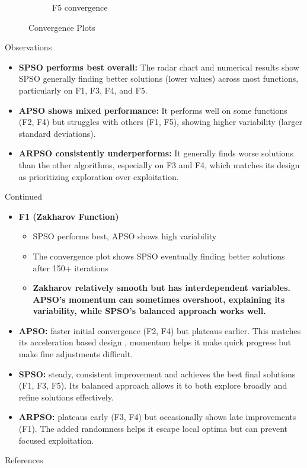 \documentclass[aspectratio=169]{beamer}
\begin{document}
\begin{frame}
\begin{figure}
\begin{subfigure}[b]{0.19\textwidth}
            \caption*{F5 convergence}
        \end{subfigure}
        \vspace{-1ex}
        \caption*{\scriptsize Convergence Plots}
    \end{figure}
\end{frame}

\begin{frame}{Observations}
    \begin{itemize}
        \item \textbf{SPSO performs best overall:} The radar chart and numerical results show SPSO generally finding better solutions (lower values) across most functions, particularly on F1, F3, F4, and F5.
        \item \textbf{APSO shows mixed performance:} It performs well on some functions (F2, F4) but struggles with others (F1, F5), showing higher variability (larger standard deviations).
        \item \textbf{ARPSO consistently underperforms:} It generally finds worse solutions than the other algorithms, especially on F3 and F4, which matches its design as prioritizing exploration over exploitation.
    \end{itemize}
\end{frame}
\begin{frame}{Continued}
    \begin{itemize}
        \item \textbf{F1 (Zakharov Function)}
        \begin{itemize}
            \item SPSO performs best, APSO shows high variability
            \item The convergence plot shows SPSO eventually finding better solutions after 150+ iterations
            \item \textbf{Zakharov relatively smooth but has interdependent variables. APSO's momentum can sometimes overshoot, explaining its variability, while SPSO's balanced approach works well.}
        \end{itemize}
        \item \textbf{APSO:} faster initial convergence (F2, F4) but plateaus earlier. This matches its acceleration based design , momentum helps it make quick progress but make fine adjustments difficult.
        \item \textbf{SPSO:} steady, consistent improvement and achieves the best final solutions (F1, F3, F5). Its balanced approach allows it to both explore broadly and refine solutions effectively.
        \item \textbf{ARPSO:} plateaus early (F3, F4) but occasionally shows late improvements (F1). The added randomness helps it escape local optima but can prevent focused exploitation.
    \end{itemize}
\end{frame}

\begin{frame}{References}
    
        
\end{frame}
\end{document}
